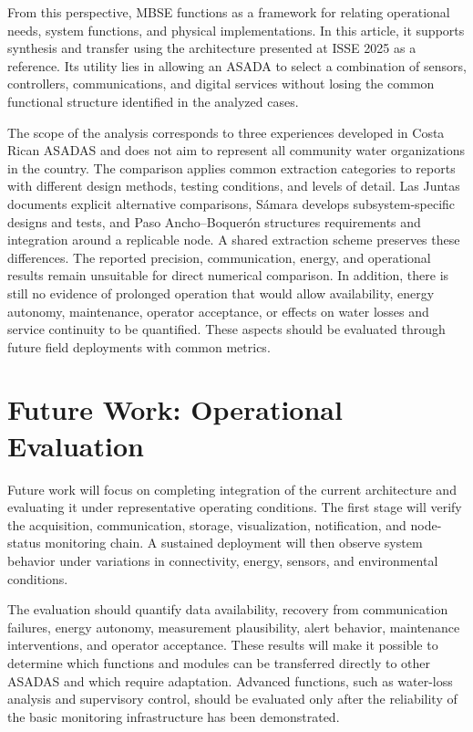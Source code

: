 \documentclass[conference]{IEEEtran}
\begin{document}
From this perspective, MBSE functions as a framework for relating operational needs, system functions, and physical implementations. In this article, it supports synthesis and transfer using the architecture presented at ISSE 2025 as a reference. Its utility lies in allowing an ASADA to select a combination of sensors, controllers, communications, and digital services without losing the common functional structure identified in the analyzed cases.

The scope of the analysis corresponds to three experiences developed in Costa Rican ASADAS and does not aim to represent all community water organizations in the country. The comparison applies common extraction categories to reports with different design methods, testing conditions, and levels of detail. Las Juntas documents explicit alternative comparisons, Sámara develops subsystem-specific designs and tests, and Paso Ancho--Boquerón structures requirements and integration around a replicable node. A shared extraction scheme preserves these differences. The reported precision, communication, energy, and operational results remain unsuitable for direct numerical comparison. In addition, there is still no evidence of prolonged operation that would allow availability, energy autonomy, maintenance, operator acceptance, or effects on water losses and service continuity to be quantified. These aspects should be evaluated through future field deployments with common metrics.

\section{Future Work: Operational Evaluation}
Future work will focus on completing integration of the current architecture and evaluating it under representative operating conditions. The first stage will verify the acquisition, communication, storage, visualization, notification, and node-status monitoring chain. A sustained deployment will then observe system behavior under variations in connectivity, energy, sensors, and environmental conditions.

The evaluation should quantify data availability, recovery from communication failures, energy autonomy, measurement plausibility, alert behavior, maintenance interventions, and operator acceptance. These results will make it possible to determine which functions and modules can be transferred directly to other ASADAS and which require adaptation. Advanced functions, such as water-loss analysis and supervisory control, should be evaluated only after the reliability of the basic monitoring infrastructure has been demonstrated.
\end{document}
